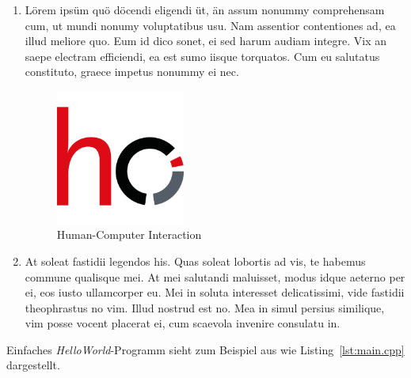 \documentclass[a4paper,10pt]{article}
\begin{document}
\kopf
\renewcommand{\figurename}{Figure}

\begin{enumerate}

\item Lörem ipsüm quö döcendi eligendi üt, än assum nonummy comprehensam cum, ut mundi nonumy voluptatibus usu. Nam assentior contentiones ad, ea illud meliore quo. Eum id dico sonet, ei sed harum audiam integre. Vix an saepe electram efficiendi, ea est sumo iisque torquatos. Cum eu salutatus constituto, graece impetus nonummy ei nec.


\begin{figure}[ht]
\centering \includegraphics[width=0.4\textwidth]{images/uhh-hci.png}
\caption{Human-Computer Interaction}
\label{fig:wwu_logo}
\end{figure}

\item At soleat fastidii legendos his. Quas soleat lobortis ad vis, te habemus commune qualisque mei. At mei salutandi maluisset, modus idque aeterno per ei, eos iusto ullamcorper eu. Mei in soluta interesset delicatissimi, vide fastidii theophrastus no vim. Illud nostrud est no. Mea in simul persius similique, vim posse vocent placerat ei, cum scaevola invenire consulatu in.

\end{enumerate}


Einfaches \emph{HelloWorld}-Programm sieht zum Beispiel aus wie Listing~\ref{lst:main.cpp} dargestellt.

\end{document}
